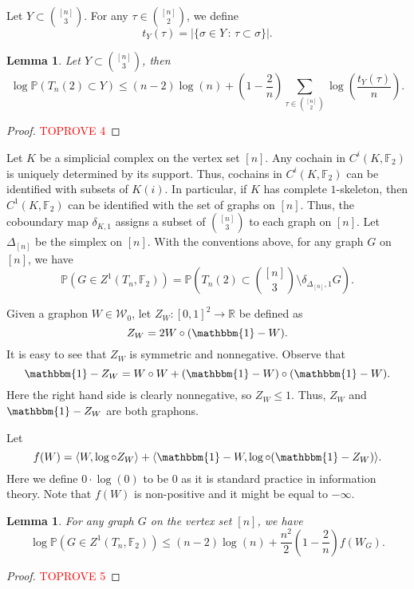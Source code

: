 \documentclass[11pt,a4paper]{article}
\theoremstyle{plain}
\newtheorem{lemma}[theorem]{Lemma}
\theoremstyle{definition}
\begin{document}
Let $Y\subset {{[n]}\choose {3}}$. For any $\tau\in {{[n]}\choose {2}}$, we define
\[t_Y(\tau)=|\{\sigma\in Y\,:\, \tau\subset \sigma\}|.\]

\begin{lemma}\label{upperb}
Let $Y\subset {{[n]}\choose {3}}$, then
\[\log \mathbb{P}(T_n(2)\subset Y)\le (n-2)\log (n)+\left(1-\frac{2}n\right)\sum_{\tau\in {{[n]}\choose{2}}} \log\left(\frac{t_Y(\tau)}{n}\right).\]

\end{lemma}
\begin{proof}\textcolor{red}{TOPROVE 4}\end{proof}


Let $K$ be a simplicial complex on the vertex set $[n]$. Any cochain in $C^i(K,\mathbb{F}_2)$ is uniquely determined by its support. Thus, cochains in $C^i(K,\mathbb{F}_2)$ can be identified with subsets of $K(i)$. In particular, if $K$ has complete $1$-skeleton, then  $C^1(K,\mathbb{F}_2)$ can be identified with the set of graphs on $[n]$. Thus, the coboundary map $\delta_{K,1}$ assigns a subset of ${{[n]}\choose 3}$ to each graph on $[n]$. Let $\Delta_{[n]}$ be the simplex on $[n]$. With the conventions above, for any graph $G$ on $[n]$, we have
\begin{equation}\label{cohgraph}
    \mathbb{P}\left(G\in Z^1(T_n,\mathbb{F}_2)\right)=\mathbb{P}\left(T_n(2)\subset {{[n]}\choose 3} \setminus   \delta_{\Delta_{[n]},1} G\right).
\end{equation}


Given a graphon $W\in \mathcal{W}_0$, let $Z_W:[0,1]^2\to \mathbb{R}$ be defined as
\[Z_W=2W\circ (\mathbbm{1}-W).\]
It is easy to see that $Z_W$ is symmetric and nonnegative. Observe that
\[\mathbbm{1}-Z_W=W\circ W+(\mathbbm{1}-W)\circ (\mathbbm{1}-W).\]
Here the right hand side is clearly  nonnegative, so $Z_W\le 1$. Thus, $Z_W$ and $\mathbbm{1}-Z_W$ are both graphons. 

Let
\begin{equation}\label{fdef}f(W)=\langle W, \log\circ Z_W\rangle+\langle \mathbbm{1}-W, \log\circ(\mathbbm{1}- Z_W)\rangle.\end{equation}
Here we define $0\cdot \log(0)$ to be $0$ as it is standard practice in information theory. Note that $f(W)$ is non-positive and it might be equal to $-\infty$. 

\begin{lemma}\label{upperbf}
For any graph $G$ on the vertex set $[n]$, we have 
\[\log \mathbb{P}(G\in Z^1(T_n,\mathbb{F}_2))\le (n-2)\log (n)+\frac{n^2}2\left(1-\frac{2}n\right)f(W_G).\]
\end{lemma}
\begin{proof}\textcolor{red}{TOPROVE 5}\end{proof}
\end{document}
